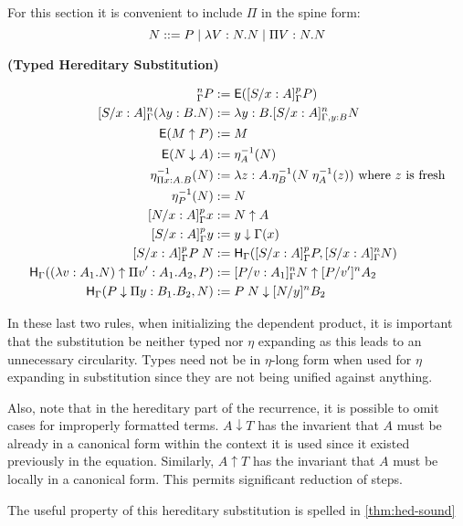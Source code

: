 For this section it is convenient to include $\Pi$ in the spine form: 
\[
N ::= P 
\; | \; \lambda V : N . N 
\; | \; \Pi V : N . N 
\]


\begin{definition}
\textbf{(Typed Hereditary Substitution)}

\begin{align}
[S / x : A]^n_{\Gamma } P &:= \m{E}([S / x : A]^p_{\Gamma } P)
\\
[S / x : A]^n_{\Gamma } (\lambda y : B . N) &:= \lambda y:B . [S / x : A]^n_{\Gamma, y : B} N
\\
\m{E}(M \uparrow P) &:= M
\\
\m{E}(N \downarrow A) &:= \eta^{-1}_A (N)
\\
\eta^{-1}_{\Pi x : A . B}(N) &:= \lambda z : A . \eta^{-1}_B(N \; \eta^{-1}_A(z))
 \text{ where $z$ is fresh}
\\
\eta^{-1}_{P}(N) &:= N
\\
[ N / x : A]^p_{\Gamma} x &:= N \uparrow A
\\
[S / x : A]^p_{\Gamma} y &:= y \downarrow \Gamma(x)
\\
[S / x : A]^p_{\Gamma } P\;N &:= 
\m{H}_{\Gamma} ( [S/x : A]^p_{\Gamma} P , [S/x : A]^n_{\Gamma} N) 
\\
\m{H}_{\Gamma} ((\lambda v : A_1 . N) \uparrow \Pi v' : A_1 . A_2 , P) 
&:= [P/v : A_1]^n_{\Gamma} N \uparrow [P/v']^n A_2
\\
\m{H}_{\Gamma}(P \downarrow \Pi y : B_1 . B_2 , N) &:= P\; N \downarrow [N/y]^nB_2
\end{align}

\label{def:tyhered}
\end{definition} 

In these last two rules, when initializing the dependent product, it is important that the substitution be neither typed
nor $\eta$ expanding as this leads to an unnecessary circularity.  Types need not be in $\eta$-long form
when used for $\eta$ expanding in substitution since they are not being unified against anything.

Also, note that in the hereditary part of the recurrence, 
it is possible to omit cases for improperly formatted terms.  $A \downarrow T$ has the invarient that
$A$ must be already in a canonical form within the context it is used since it existed previously in the
equation.  Similarly, $A \uparrow T$ has the invariant that $A$ must be locally in a canonical form.
This permits significant reduction of steps.

The useful property of this hereditary substitution is spelled in \ref{thm:hed-sound}

